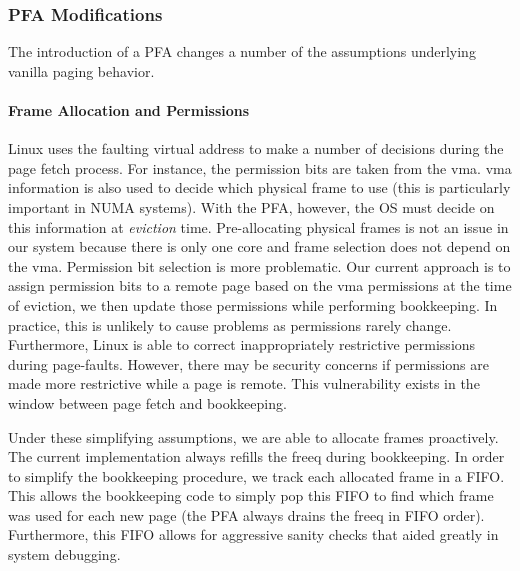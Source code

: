 \subsubsection{PFA Modifications}
The introduction of a PFA changes a number of the assumptions underlying
vanilla paging behavior.

\paragraph{Frame Allocation and Permissions}
Linux uses the faulting virtual address to make a number of decisions during
the page fetch process. For instance, the permission bits are taken from the
\gls{vma}. \gls{vma} information is also used to decide which physical frame to
use (this is particularly important in NUMA systems). With the PFA, however,
the OS must decide on this information at \emph{eviction} time. Pre-allocating
physical frames is
not an issue in our system because there is only one core and frame selection
does not depend on the \gls{vma}. Permission bit selection is more problematic. Our current
approach is to assign permission bits to a remote page based on the \gls{vma}
permissions at the time of eviction, we then update those permissions while
performing bookkeeping. In practice, this is unlikely to cause
problems as permissions rarely change. Furthermore, Linux is able to correct
inappropriately restrictive permissions during page-faults. However, there may
be security concerns if permissions are made more restrictive while a page is
remote. This vulnerability exists in the window between page fetch and
bookkeeping.

Under these simplifying assumptions, we are able to allocate frames
proactively. The current implementation always refills the \gls{freeq} during
bookkeeping. In order to simplify the bookkeeping procedure, we track
each allocated frame in a FIFO. This allows the bookkeeping code to simply pop
this FIFO to find which frame was used for each new page (the PFA always drains
the \gls{freeq} in FIFO order). Furthermore, this FIFO allows for aggressive
sanity checks that aided greatly in system debugging.

